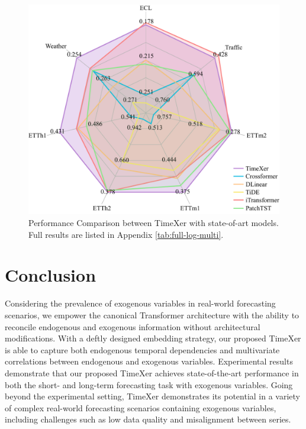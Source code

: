 \documentclass[nohyperref]{article}
\theoremstyle{plain}
\theoremstyle{definition}
\theoremstyle{remark}
\begin{document}
\begin{figure}[t]
    \vspace{-10pt}
    \centering
    \includegraphics[width=0.7\linewidth]{fig/TimeXer_Radar_MK2.pdf}
    \vspace{-10pt}
    \caption{Performance Comparison between TimeXer with state-of-art models. Full results are listed in Appendix \ref{tab:full-log-multi}.}
    \vspace{-20pt}
    \label{fig:multivariate-result}
\end{figure}
\vspace{-5pt}
\section{Conclusion}
Considering the prevalence of exogenous variables in real-world forecasting scenarios, we empower the canonical Transformer architecture with the ability to reconcile endogenous and exogenous information without architectural modifications. With a deftly designed embedding strategy, our proposed TimeXer is able to capture both endogenous temporal dependencies and multivariate correlations between endogenous and exogenous variables. 
Experimental results demonstrate that our proposed TimeXer achieves state-of-the-art performance in both the short- and long-term forecasting task with exogenous variables.
Going beyond the experimental setting, TimeXer demonstrates its potential in a variety of complex real-world forecasting scenarios containing exogenous variables, including challenges such as low data quality and misalignment between series.


\nocite{langley00}
\end{document}
